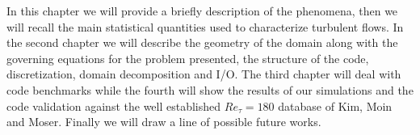 In this chapter we will provide a briefly description of the phenomena, then we will recall the main statistical quantities used to characterize turbulent flows. In the second chapter we will describe the geometry of the domain along with the governing equations for the problem presented, the structure of the code, discretization, domain decomposition and I/O.
The third chapter will deal with code benchmarks while the fourth will show the results of our simulations and the code validation against the well established $Re_{\tau}=180$ database of Kim, Moin and Moser. Finally we will draw a line of possible future works.






  




  